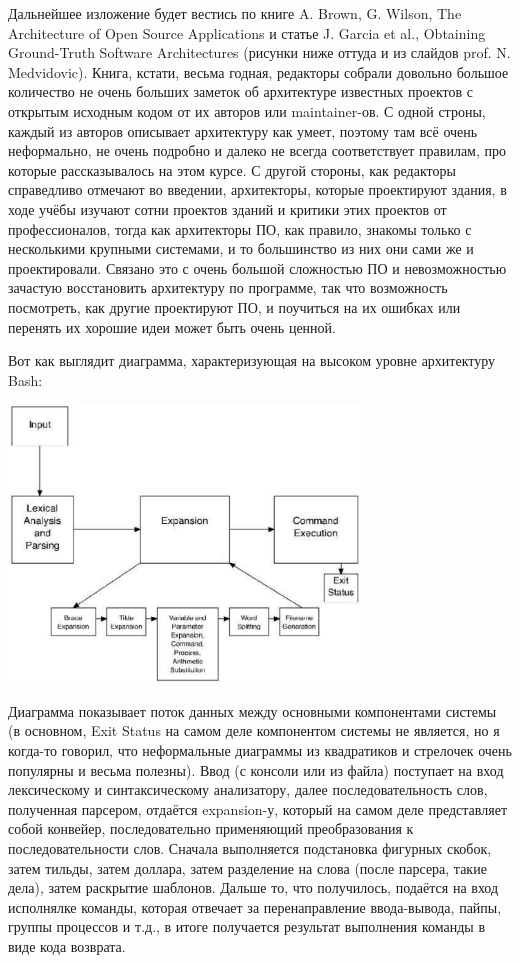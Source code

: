 \documentclass{../text-style}
\begin{document}
Дальнейшее изложение будет вестись по книге A. Brown, G. Wilson, The Architecture of Open Source Applications и статье J. Garcia et al., Obtaining Ground-Truth Software Architectures (рисунки ниже оттуда и из слайдов prof. N. Medvidovic). Книга, кстати, весьма годная, редакторы собрали довольно большое количество не очень больших заметок об архитектуре известных проектов с открытым исходным кодом от их авторов или maintainer-ов. С одной строны, каждый из авторов описывает архитектуру как умеет, поэтому там всё очень неформально, не очень подробно и далеко не всегда соответствует правилам, про которые рассказывалось на этом курсе. С другой стороны, как редакторы справедливо отмечают во введении, архитекторы, которые проектируют здания, в ходе учёбы изучают сотни проектов зданий и критики этих проектов от профессионалов, тогда как архитекторы ПО, как правило, знакомы только с несколькими крупными системами, и то большинство из них они сами же и проектировали. Связано это с очень большой сложностью ПО и невозможностью зачастую восстановить архитектуру по программе, так что возможность посмотреть, как другие проектируют ПО, и поучиться на их ошибках или перенять их хорошие идеи может быть очень ценной.

Вот как выглядит диаграмма, характеризующая на высоком уровне архитектуру Bash:

\begin{center}
    \includegraphics[width=0.7\textwidth]{bashArchitecture.png}
\end{center}

Диаграмма показывает поток данных между основными компонентами системы (в основном, Exit Status на самом деле компонентом системы не является, но я когда-то говорил, что неформальные диаграммы из квадратиков и стрелочек очень популярны и весьма полезны). Ввод (с консоли или из файла) поступает на вход лексическому и синтаксическому анализатору, далее последовательность слов, полученная парсером, отдаётся expansion-у, который на самом деле представляет собой конвейер, последовательно применяющий преобразования к последовательности слов. Сначала выполняется подстановка фигурных скобок, затем тильды, затем доллара, затем разделение на слова (после парсера, такие дела), затем раскрытие шаблонов. Дальше то, что получилось, подаётся на вход исполнялке команды, которая отвечает за перенаправление ввода-вывода, пайпы, группы процессов и т.д., в итоге получается результат выполнения команды в виде кода возврата.
\end{document}
